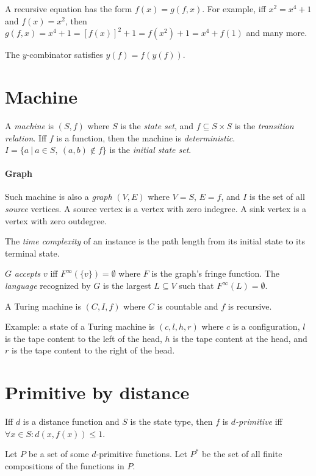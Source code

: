 A recursive equation has the form \(f(x) = g(f,x)\).
For example, iff \(x^2 = x^4 + 1\) and \(f(x) = x^2\), then \(g(f,x) = x^4 + 1 = [f(x)]^2 + 1 = f(x^2) + 1 = x^4 + f(1)\)
and many more.

The \(y\)-combinator satisfies \(y(f) = f(y(f))\).

\section{Machine}

A \emph{machine} is \((S,f)\)
where \(S\) is the \emph{state set},
and \(f \subseteq S \times S\) is the \emph{transition relation}.
Iff \(f\) is a function, then the machine is \emph{deterministic}.
\(I = \{ a ~|~ a \in S, ~ (a,b) \not\in f \}\) is the \emph{initial state set}.

\paragraph{Graph}
Such machine is also a \emph{graph} \((V,E)\) where \(V=S\), \(E = f\),
and \(I\) is the set of all \emph{source} vertices.
A source vertex is a vertex with zero indegree.
A sink vertex is a vertex with zero outdegree.

The \emph{time complexity} of an instance is the path length from its initial state to its terminal state.

\(G\) \emph{accepts} \(v\) iff \(F^\infty(\{v\}) = \emptyset\) where \(F\) is the graph's fringe function.
The \emph{language} recognized by \(G\) is the largest \(L \subseteq V\) such that \(F^\infty(L) = \emptyset\).

A Turing machine is \((C,I,f)\)
where \(C\) is countable
and \(f\) is recursive.

Example: a state of a Turing machine is \((c,l,h,r)\)
where \(c\) is a configuration,
\(l\) is the tape content to the left of the head,
\(h\) is the tape content at the head,
and \(r\) is the tape content to the right of the head.

\section{Primitive by distance}

Iff \(d\) is a distance function and \(S\) is the state type,
then \(f\) is \emph{\(d\)-primitive} iff \(\forall x \in S : d(x,f(x)) \le 1\).

Let \(P\) be a set of some \(d\)-primitive functions.
Let \(P^*\) be the set of all finite compositions of the functions in \(P\).

